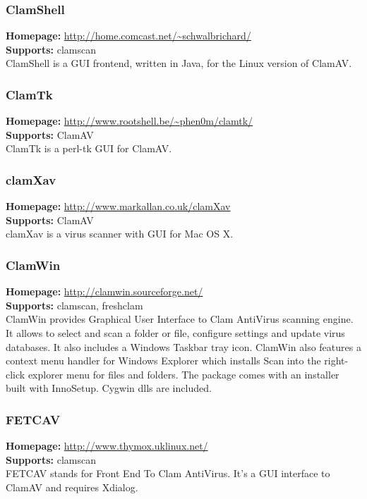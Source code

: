 \documentclass[a4paper,titlepage,12pt]{article}
\begin{document}
    \subsubsection{ClamShell}
    \textbf{Homepage:} \url{http://home.comcast.net/~schwalbrichard/}\\
    \textbf{Supports:} clamscan\\[4pt]
    ClamShell is a GUI frontend, written in Java, for the Linux version of
    ClamAV.

    \subsubsection{ClamTk}
    \textbf{Homepage:} \url{http://www.rootshell.be/~phen0m/clamtk/}\\
    \textbf{Supports:} ClamAV\\[4pt]
    ClamTk is a perl-tk GUI for ClamAV.

    \subsubsection{clamXav} \label{clamxav}
    \textbf{Homepage:} \url{http://www.markallan.co.uk/clamXav}\\
    \textbf{Supports:} ClamAV\\[4pt]
    clamXav is a virus scanner with GUI for Mac OS X.

    \subsubsection{ClamWin} \label{clamwin}
    \textbf{Homepage:} \url{http://clamwin.sourceforge.net/}\\
    \textbf{Supports:} clamscan, freshclam\\[4pt]
    ClamWin provides Graphical User Interface to Clam AntiVirus scanning
    engine. It allows to select and scan a folder or file, configure settings
    and update virus databases. It also includes a Windows Taskbar tray icon.
    ClamWin also features a context menu handler for Windows Explorer which
    installs Scan into the right-click explorer menu for files and folders.
    The package comes with an installer built with InnoSetup. Cygwin dlls
    are included.

    \subsubsection{FETCAV}
    \textbf{Homepage:} \url{http://www.thymox.uklinux.net/}\\
    \textbf{Supports:} clamscan\\[4pt]
    FETCAV stands for Front End To Clam AntiVirus. It's a GUI interface
    to ClamAV and requires Xdialog.
\end{document}
